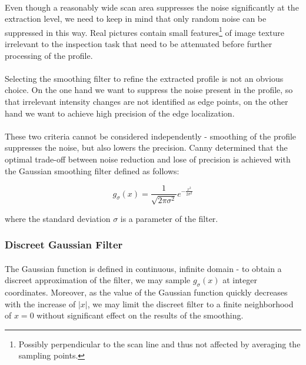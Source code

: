\paragraph*{}
Even though a reasonably wide scan area suppresses the noise significantly at the extraction level, we need to keep in mind that only random noise can be suppressed in this way. Real pictures contain small features\footnote{Possibly perpendicular to the scan line and thus not affected by averaging the sampling points.} of image texture irrelevant to the inspection task that need to be attenuated before further processing of the profile. 

\paragraph*{}
Selecting the smoothing filter to refine the extracted profile is not an obvious choice. On the one hand we want to suppress the noise present in the profile, so that irrelevant intensity changes are not identified as edge points, on the other hand we want to achieve high precision of the edge localization. 

\paragraph*{}
These two criteria cannot be considered independently - smoothing of the profile suppresses the noise, but also lowers the precision. Canny determined\cite{Canny86} that the optimal trade-off between noise reduction and lose of precision is achieved with the Gaussian smoothing filter defined as follows:

\[
    g_{\sigma}(x)= \frac{1}{\sqrt{2\pi \sigma^2}} e^{-\frac{x^2}{2 \sigma^2}}
\]

where the standard deviation $\sigma$ is a parameter of the filter.

\subsubsection{Discreet Gaussian Filter}

\paragraph*{}
The Gaussian function is defined in continuous, infinite domain - to obtain a discreet approximation of the filter, we may sample $g_{\sigma}(x)$ at integer coordinates\cite{JainKasturi95}. Moreover, as the value of the Gaussian function quickly decreases with the increase of $|x|$, we may limit the discreet filter to a finite neighborhood of $x = 0$ without significant effect on the results of the smoothing. 

